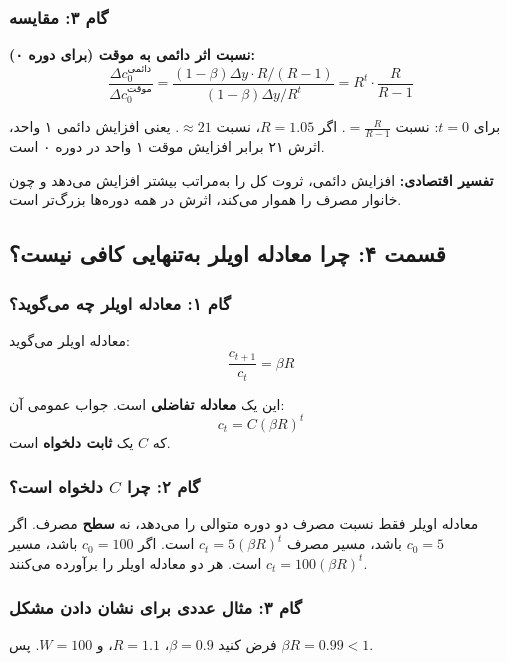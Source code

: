 \documentclass[12pt,a4paper]{article}
\begin{document}
\subsubsection{گام ۳: مقایسه}

\textbf{نسبت اثر دائمی به موقت (برای دوره ۰):}
\[
	\frac{\Delta c_0^{\text{دائمی}}}{\Delta c_0^{\text{موقت}}} = \frac{(1-\beta) \Delta y \cdot R/(R-1)}{(1-\beta) \Delta y / R^t} = R^t \cdot \frac{R}{R-1}
\]

برای $t=0$: نسبت $= \frac{R}{R-1}$. اگر $R=1.05$، نسبت $\approx 21$. یعنی افزایش دائمی ۱ واحد، اثرش ۲۱ برابر افزایش موقت ۱ واحد در دوره ۰ است.

\textbf{تفسیر اقتصادی:} افزایش دائمی، ثروت کل را به‌مراتب بیشتر افزایش می‌دهد و چون خانوار مصرف را هموار می‌کند، اثرش در همه دوره‌ها بزرگ‌تر است.

\subsection{قسمت ۴: چرا معادله اویلر به‌تنهایی کافی نیست؟}

\subsubsection{گام ۱: معادله اویلر چه می‌گوید؟}

معادله اویلر می‌گوید:
\[
	\frac{c_{t+1}}{c_t} = \beta R
\]

این یک \textbf{معادله تفاضلی} است. جواب عمومی آن:
\[
	c_t = C (\beta R)^t
\]
که $C$ یک \textbf{ثابت دلخواه} است.

\subsubsection{گام ۲: چرا $C$ دلخواه است؟}

معادله اویلر فقط نسبت مصرف دو دوره متوالی را می‌دهد، نه \textbf{سطح} مصرف. اگر $c_0 = 5$ باشد، مسیر مصرف $c_t = 5(\beta R)^t$ است. اگر $c_0 = 100$ باشد، مسیر $c_t = 100(\beta R)^t$ است. هر دو معادله اویلر را برآورده می‌کنند.

\subsubsection{گام ۳: مثال عددی برای نشان دادن مشکل}

فرض کنید $\beta = 0.9$، $R = 1.1$، و $W = 100$. پس $\beta R = 0.99 < 1$.
\end{document}
